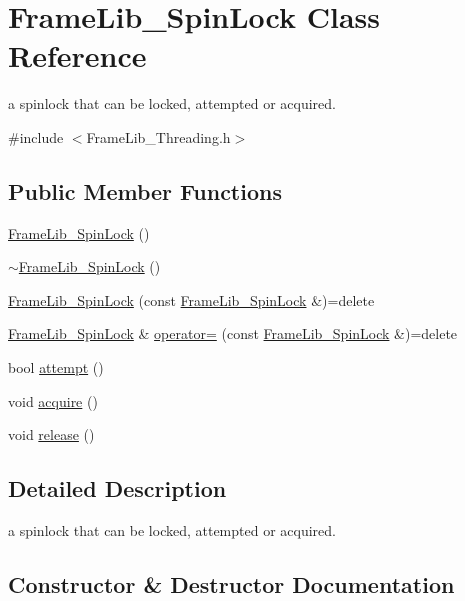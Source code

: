 \hypertarget{class_frame_lib___spin_lock}{}\section{Frame\+Lib\+\_\+\+Spin\+Lock Class Reference}
\label{class_frame_lib___spin_lock}


a spinlock that can be locked, attempted or acquired.  




{\ttfamily \#include $<$Frame\+Lib\+\_\+\+Threading.\+h$>$}

\subsection*{Public Member Functions}
\begin{DoxyCompactItemize}
\item 
\hyperlink{class_frame_lib___spin_lock_a1fdaf90d7d7fdc4efbbd46319f019b91}{Frame\+Lib\+\_\+\+Spin\+Lock} ()
\item 
\hyperlink{class_frame_lib___spin_lock_abfd0b5b37c9f8a3255648b9cac20ef05}{$\sim$\+Frame\+Lib\+\_\+\+Spin\+Lock} ()
\item 
\hyperlink{class_frame_lib___spin_lock_a63e0cf9cc8ceb46b5b021a37d987c19a}{Frame\+Lib\+\_\+\+Spin\+Lock} (const \hyperlink{class_frame_lib___spin_lock}{Frame\+Lib\+\_\+\+Spin\+Lock} \&)=delete
\item 
\hyperlink{class_frame_lib___spin_lock}{Frame\+Lib\+\_\+\+Spin\+Lock} \& \hyperlink{class_frame_lib___spin_lock_aedba83c22f68479e3267a28ecbbe5311}{operator=} (const \hyperlink{class_frame_lib___spin_lock}{Frame\+Lib\+\_\+\+Spin\+Lock} \&)=delete
\item 
bool \hyperlink{class_frame_lib___spin_lock_ab77f604b7e610535d0b48c5f2147daff}{attempt} ()
\item 
void \hyperlink{class_frame_lib___spin_lock_a9718ce6f4e9cb09d6d614e1e7c36a1ae}{acquire} ()
\item 
void \hyperlink{class_frame_lib___spin_lock_a99190b01885c12923f76822d1ba7fb1f}{release} ()
\end{DoxyCompactItemize}


\subsection{Detailed Description}
a spinlock that can be locked, attempted or acquired. 

\subsection{Constructor \& Destructor Documentation}
\mbox{\label{class_frame_lib___spin_lock_a1fdaf90d7d7fdc4efbbd46319f019b91}} 

